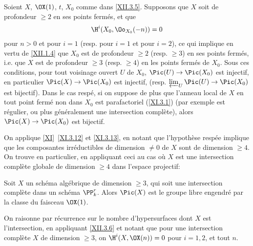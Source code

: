 \begin{corollaire} \label{XII.3.6} Soient $X$, $\OX(1)$, $t$, $X_0$ comme dans \ref{XII.3.5}. Supposons que $X$ soit de profondeur $\geq 2$ en ses points ferm\'es, et que
\[
\H^i(X_0, \Oo_{X_0}(-n))=0
\]
pour $n>0$ et pour $i=1$ (resp. pour $i=1$ et pour $i=2$), ce qui implique en vertu de \ref{XII.1.4} que $X_0$ est de profondeur $\geq 2$ (resp. $\geq 3$) en ses points ferm\'es, i.e. que $X$ est de profondeur $\geq 3$ (resp. $\geq 4$) en les points ferm\'es de $X_0$. Sous ces conditions, pour tout voisinage ouvert $U$ de $X_0$, $\Pic(U)\to\Pic(X_0)$ est injectif, en particulier $\Pic(X)\to\Pic(X_0)$ est injectif, (resp. $\varprojlim_U \Pic(U)\to\Pic(X_0)$ est bijectif). Dans le cas resp\'e, si on suppose de plus que l'anneau local de $X$ en tout point ferm\'e non dans $X_0$ est parafactoriel (\ref{XI.3.1}) (par exemple est r\'egulier, ou plus g\'en\'eralement une intersection compl\`ete), alors $\Pic(X)\to\Pic(X_0)$ est bijectif.
\end{corollaire}
On applique \ref{XI}~\ref{XI.3.12} et \ref{XI.3.13}, en notant que l'hypoth\`ese resp\'ee implique que les composantes irr\'eductibles de dimension $\neq 0$ de $X$ sont de dimension $\geq 4$. On trouve en particulier, en appliquant ceci au cas o\`u $X$ est une intersection compl\`ete globale de dimension $\geq 4$ dans l'espace projectif:

\begin{corollaire} \label{XII.3.7} Soit $X$ un sch\'ema alg\'ebrique de dimension $\geq 3$, qui soit une intersection compl\`ete dans un sch\'ema $\PP_k^r$. Alors $\Pic(X)$ est le groupe libre engendr\'e par la classe du faisceau $\OX(1)$.
\end{corollaire}
On raisonne par r\'ecurrence sur le nombre d'hypersurfaces dont $X$ est l'intersection, en appliquant \ref{XII.3.6} et notant que pour une intersection compl\`ete $X$ de dimension $\geq 3$, on $\H^i(X, \OX(n))=0$ pour $i=1, 2$, et tout $n$.

